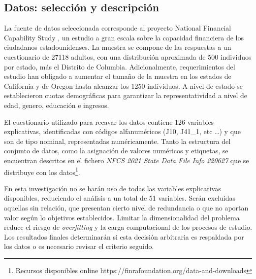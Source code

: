 \documentclass[a4paper, 11pt]{article}
\begin{document}
\subsection{Datos: selección y descripción}
\label{sec:sub:datasets}
La fuente de datos seleccionada corresponde al proyecto National Financial Capability Study 
\cite{NFCS01}, un estudio a gran escala sobre la capacidad financiera de los ciudadanos 
estadounidenses. La muestra se compone de las respuestas a un cuestionario de 27118 adultos, 
con una distribución aproximada de 500 individuos por estado, más el Distrito de Columbia. 
Adicionalmente, requerimientos del estudio han obligado a aumentar el tamaño de la muestra en 
los estados de California y de Oregon hasta alcanzar los 1250 individuos. A nivel de estado 
se establecieron cuotas demográficas para garantizar la representatividad a nivel de edad,
genero, educación e ingresos.

El cuestionario utilizado para recavar los datos contiene 126 variables explicativas, 
identificadas con códigos alfanuméricos (J10, J41\_1, etc \dots) y que son de tipo nominal, 
representadas numéricamente. Tanto la estructura del conjunto de datos, como la asignación de 
valores numéricos y etiquetas, se encuentran descritos en el fichero \textit{NFCS 2021 State 
Data File Info 220627} que se distribuye con los datos\footnote{Recursos disponibles online 
https://finrafoundation.org/data-and-downloads}. 

En esta investigación no se harán uso de todas las variables explicativas disponibles, reduciendo
el análisis a un total de 51 variables. Serán excluidas aquellas sin relación, que presentan cierto
nivel de redundancia o que no aportan valor según lo objetivos establecidos. Limitar la dimensionalidad
del problema reduce el riesgo de \textit{overfitting} y la carga computacional de los 
procesos de estudio. Los resultados finales determinarán si esta decisión arbitraria 
es respaldada por los datos o es necesario revisar el criterio seguido.
\end{document}
